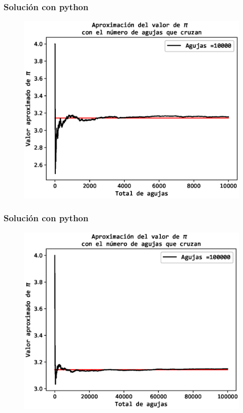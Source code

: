 \documentclass[12pt]{beamer}
\begin{document}
\begin{frame}
\frametitle{Solución con python}
\begin{figure}
  \centering
  \includegraphics[scale=0.6]{Imagenes/aproximacionPi_10000.eps}
\end{figure}
\end{frame}
\begin{frame}
\frametitle{Solución con python}
\begin{figure}
  \centering
  \includegraphics[scale=0.6]{Imagenes/aproximacionPi_100000.eps}
\end{figure}
\end{frame}
\end{document}
